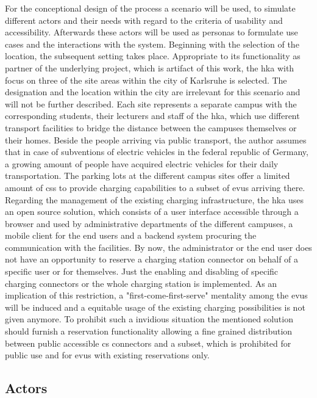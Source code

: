 For the conceptional design of the process a scenario will be used, to simulate different actors and their needs with regard to the criteria of usability and accessibility. Afterwards these actors will be used as personas to formulate use cases and the interactions with the system. 
Beginning with the selection of the location, the subsequent setting takes place. Appropriate to its functionality as partner of the underlying project, which is artifact of this work, the \acrfull{hka} with focus on three of the site areas within the city of Karlsruhe is selected.
The designation and the location within the city are irrelevant for this scenario and will not be further described.
Each site represents a separate campus with the corresponding students, their lecturers and staff of the \acrshort{hka}, which use different transport facilities to bridge the distance between the campuses themselves or their homes. 
Beside the people arriving via public transport, the author assumes that in case of subventions of electric vehicles in the federal republic of Germany, a growing amount of people have acquired electric vehicles for their daily transportation. 
The parking lots at the different campus sites offer a limited amount of \acrfull{cs}s to provide charging capabilities to a subset of \acrfull{evu}s arriving there. 
Regarding the management of the existing charging infrastructure, the \acrshort{hka} uses an open source solution, which consists of a user interface accessible through a browser and used by administrative departments of the different campuses, a mobile client for the end users and a backend system procuring the communication with the facilities. 
By now, the administrator or the end user does not have an opportunity to reserve a charging station connector on behalf of a specific user or for themselves.
Just the enabling and disabling of specific charging connectors or the whole charging station is implemented.
As an implication of this restriction, a "first-come-first-serve" mentality among the \acrshort{evu}s will be induced and a equitable usage of the existing charging possibilities is not given anymore.
To prohibit such a invidious situation the mentioned solution should furnish a reservation functionality allowing a fine grained distribution between public accessible \acrshort{cs} connectors and a subset, which is prohibited for public use and for \acrshort{evu}s with existing reservations only.

\subsection{Actors}
\label{ch:Requirements Engineering and Process Design:sec:Scenario:ssec:Actors}


